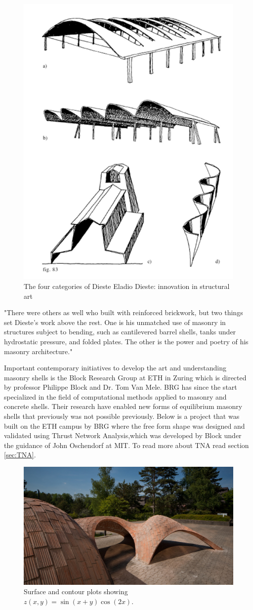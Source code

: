 \begin{figure}[H]
\centering
\includegraphics[width=0.4\linewidth ]{figure/Introduction/DiesteFour.JPG}
\caption{The four categories of Dieste Eladio Dieste: innovation in structural art}
\end{figure}

"There were others as well who built with reinforced brickwork, but two things set Dieste’s work above the rest. One is his unmatched use of masonry in structures subject to bending, such as cantilevered barrel shells, tanks under hydrostatic pressure, and folded plates. The other is the power and poetry of his masonry architecture."


Important contemporary initiatives to develop the art and understanding masonry shells is the Block Research Group at ETH in Zuring which is directed by professor Philippe Block and Dr. Tom Van Mele. BRG has since the start specialized in the field of computational methods applied to masonry and concrete shells. Their research have enabled new forms of equilibrium masonry shells that previously was not possible previously. Below is a project that was built on the ETH campus by BRG where the free form shape was designed and validated using Thrust Network Analysis,which was developed by Block under the guidance of John Oschendorf at MIT. \cite{ref:Davis} To read more about TNA read section \ref{sec:TNA}. 

\begin{figure}[H]
\centering
\includegraphics[width=0.9\linewidth ]{figure/Introduction/Block_Vault.jpg}
\caption{Surface and contour plots showing $z(x,y)=\sin(x+y)\cos(2x)$.}
\end{figure}

